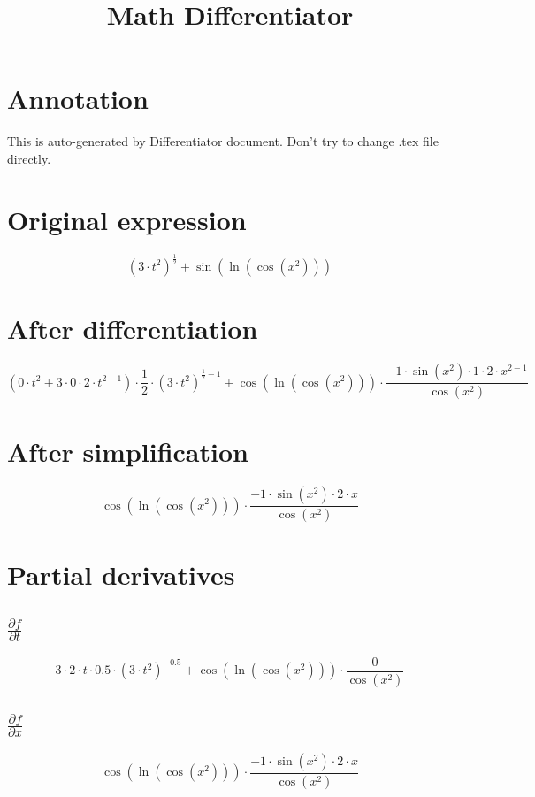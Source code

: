 \documentclass[a4paper,12pt]{article}
\title{\textbf{Math Differentiator}}
\date{}
\author{\text{Kaplin Artyom, B01-402}}
\begin{document}
\maketitle

\section*{Annotation}
This is auto-generated by Differentiator document. Don't try to change .tex file directly.

\section*{Original expression}

\[\left({3}{\cdot}{t}^{{2}}\right)^{\frac{{1}}{{2}}}{+}\sin{\left(\ln{\left(\cos{\left({x}^{{2}}\right)}\right)}\right)}\]

\section*{After differentiation}

\[\left({0}{\cdot}{t}^{{2}}{+}{3}{\cdot}{0}{\cdot}{2}{\cdot}{t}^{{2}{-}{1}}\right){\cdot}\frac{{1}}{{2}}{\cdot}\left({3}{\cdot}{t}^{{2}}\right)^{\frac{{1}}{{2}}{-}{1}}{+}\cos{\left(\ln{\left(\cos{\left({x}^{{2}}\right)}\right)}\right)}{\cdot}\frac{{-1}{\cdot}\sin{\left({x}^{{2}}\right)}{\cdot}{1}{\cdot}{2}{\cdot}{x}^{{2}{-}{1}}}{\cos{\left({x}^{{2}}\right)}}\]

\section*{After simplification}

\[\cos{\left(\ln{\left(\cos{\left({x}^{{2}}\right)}\right)}\right)}{\cdot}\frac{{-1}{\cdot}\sin{\left({x}^{{2}}\right)}{\cdot}{2}{\cdot}{x}}{\cos{\left({x}^{{2}}\right)}}\]

\section*{Partial derivatives}

\subsection*{$\frac{\partial f}{\partial t}$}

\[{3}{\cdot}{2}{\cdot}{t}{\cdot}{0.5}{\cdot}\left({3}{\cdot}{t}^{{2}}\right)^{{-0.5}}{+}\cos{\left(\ln{\left(\cos{\left({x}^{{2}}\right)}\right)}\right)}{\cdot}\frac{{0}}{\cos{\left({x}^{{2}}\right)}}\]

\subsection*{$\frac{\partial f}{\partial x}$}

\[\cos{\left(\ln{\left(\cos{\left({x}^{{2}}\right)}\right)}\right)}{\cdot}\frac{{-1}{\cdot}\sin{\left({x}^{{2}}\right)}{\cdot}{2}{\cdot}{x}}{\cos{\left({x}^{{2}}\right)}}\]
\end{document}
